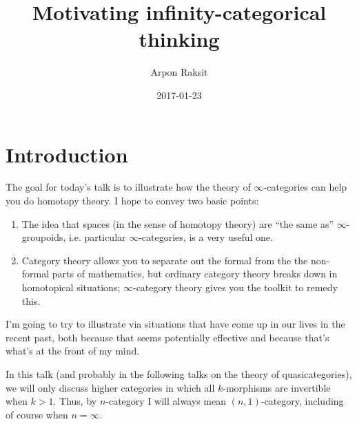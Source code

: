 


\title{Motivating infinity-categorical thinking}
\author{Arpon Raksit}
\date{2017-01-23}

\addtocounter{section}{-1}


\maketitle


\newcommand{\Bun}{\operatorname{Bun}}
\newcommand{\Cov}{\operatorname{Cov}}
\newcommand{\Fib}{\operatorname{Fib}}
\newcommand{\Loc}{\operatorname{Loc}}
\newcommand{\Sets}{\mathrm{Sets}}
\newcommand{\Spaces}{\mathrm{Spaces}}


\section{Introduction}
\label{intro}

The goal for today's talk is to illustrate how the theory of $\infty$-categories can help you do homotopy theory. I hope to convey two basic points:
\begin{enumerate}
\item The idea that spaces (in the sense of homotopy theory) are ``the same as'' $\infty$-groupoids, i.e. particular $\infty$-categories, is a very useful one.
\item Category theory allows you to separate out the formal from the the non-formal parts of mathematics, but ordinary category theory breaks down in homotopical situations; $\infty$-category theory gives you the toolkit to remedy this.
\end{enumerate}

I'm going to try to illustrate via situations that have come up in our lives in the recent past, both because that seems potentially effective and because that's what's at the front of my mind.

\begin{convention}
  In this talk (and probably in the following talks on the theory of quasicategories), we will only discuss higher categories in which all $k$-morphisms are invertible when $k > 1$. Thus, by $n$-category I will always mean $(n,1)$-category, including of course when $n = \infty$.
\end{convention}

